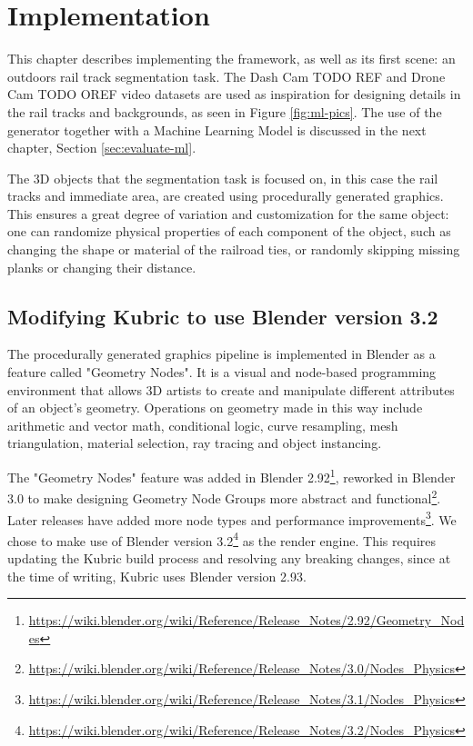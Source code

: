 \chapter{Implementation}
\label{chapter:implementation}


This chapter describes implementing the framework, as well as its first scene: an outdoors rail track segmentation task. The Dash Cam TODO REF and Drone Cam TODO OREF video datasets are used as inspiration for designing details in the rail tracks and backgrounds, as seen in Figure \ref{fig:ml-pics}. The use of the generator together with a Machine Learning Model is discussed in the next chapter, Section \ref{sec:evaluate-ml}.

The 3D objects that the segmentation task is focused on, in this case the rail tracks and immediate area, are created using procedurally generated graphics. This ensures a great degree of variation and customization for the same object: one can randomize physical properties of each component of the object, such as changing the shape or material of the railroad ties, or randomly skipping missing planks or changing their distance. 


\section{Modifying Kubric to use Blender version 3.2}
\label{sec:upgrading-kubric}

The procedurally generated graphics pipeline is implemented in Blender as a feature called "Geometry Nodes". It is a visual and node-based programming environment that allows 3D artists to create and manipulate different attributes of an object's geometry. Operations on geometry made in this way include arithmetic and vector math, conditional logic, curve resampling, mesh triangulation, material selection, ray tracing and object instancing.

The "Geometry Nodes" feature was added in Blender 2.92\footnote{\url{https://wiki.blender.org/wiki/Reference/Release_Notes/2.92/Geometry_Nodes}}, reworked in Blender 3.0 to make designing Geometry Node Groups more abstract and functional\footnote{\url{https://wiki.blender.org/wiki/Reference/Release_Notes/3.0/Nodes_Physics}}. Later releases have added more node types and performance improvements\footnote{\url{https://wiki.blender.org/wiki/Reference/Release_Notes/3.1/Nodes_Physics}}. We chose to make use of Blender version 3.2\footnote{\url{https://wiki.blender.org/wiki/Reference/Release_Notes/3.2/Nodes_Physics}} as the render engine. This requires updating the Kubric build process and resolving any breaking changes, since at the time of writing, Kubric uses Blender version 2.93.

